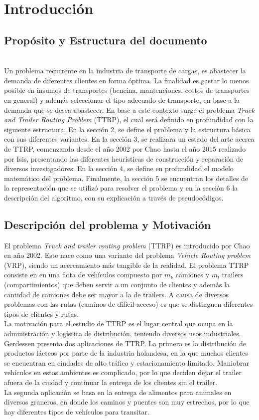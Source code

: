 \documentclass[letter, 10pt]{article}
\begin{document}
\section{Introducci\'on}

\subsection{Propósito y Estructura del documento}
\\
Un problema recurrente en la industria de transporte de cargas, es abastecer la demanda de diferentes clientes en forma óptima. La finalidad es gastar lo menos posible en insumos de transportes (bencina, mantenciones, costos de transportes en general) y además seleccionar el tipo adecuado de transporte, en base a la demanda que se desea abastecer. En base a este contexto surge el problema \textit{Truck and Trailer Routing Problem} (TTRP), el cual será definido en profundidad con la siguiente estructura: En la sección 2, se define el problema y la estructura básica con sus diferentes variantes. En la sección 3, se realizara un estado del arte acerca de TTRP, comenzando desde el año 2002 por Chao\cite{Chao} hasta el año 2015 realizado por Isis\cite{Isis}, presentando las diferentes heurísticas de construcción y reparación de diversos investigadores. En la sección 4, se define en profundidad el modelo matemático del problema. Finalmente, la sección 5 se encuentran los detalles de la representación que se utilizó para resolver el problema y en la sección 6 la descripción del algoritmo, con su explicación a través de pseudocódigos.
\subsection{Descripción del problema y Motivación}
El problema \textit{Truck and trailer routing problem} (TTRP) es introducido por Chao\cite{Chao} en año 2002. Este nace como una variante del problema \textit{Vehicle Routing problem} (VRP), siendo un acercamiento más tangible de la realidad. El problema TTRP consiste en en una flota de vehículos compuesto por $m_{k}$ camiones y $m_{l}$ trailers (compartimientos) que deben servir a un conjunto de clientes y además la cantidad de camiones debe ser mayor a la de trailers. A causa de diversos problemas con las rutas (caminos de difícil acceso) es que se distinguen diferentes tipos de clientes y rutas.\\
La motivación para el estudio de TTRP es el lugar central que ocupa en la administración y logística de distribución, teniendo diversos usos industriales. Gerdessen\cite{Gerdessen} presenta dos aplicaciones de TTRP. La primera es la distribución de productos lácteos por parte de la industria holandesa, en la que muchos clientes se encuentran en ciudades de alto tráfico y estacionamiento limitado. Maniobrar vehículos en estos ambientes es complicado, por lo que deciden dejar el trailer afuera de la ciudad y continuar la entrega de los clientes sin el trailer. \\La segunda aplicación se basa en la entrega de alimentos para animales en diversos graneros, en donde los caminos y puentes son muy estrechos, por lo que hay diferentes tipos de vehículos para transitar.
\end{document}
